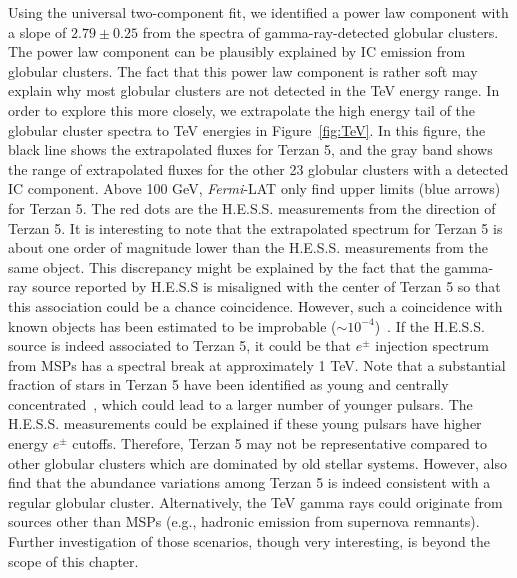 \documentclass[doublespace,nopageskip]{VTthesis}
\begin{document}
Using the universal two-component fit, we identified a power law component with a slope of $2.79 \pm  0.25$ from the spectra of gamma-ray-detected globular clusters. The power law component can be plausibly explained by IC emission from globular clusters. The fact that this power law component is rather soft may explain why most globular clusters are not detected in the TeV energy range. In order to explore this more closely, we extrapolate the high energy tail of the globular cluster spectra to TeV energies in Figure~\ref{fig:TeV}. In this figure, the black line shows the extrapolated fluxes for Terzan 5, and the gray band shows the range of extrapolated fluxes for the other 23 globular clusters with a detected IC component. Above 100 GeV, {\it Fermi}-LAT only find upper limits (blue arrows) for Terzan 5. The red dots are the H.E.S.S. measurements from the direction of Terzan 5. It is interesting to note that the extrapolated spectrum for Terzan 5 is about one order of magnitude lower than the H.E.S.S. measurements from the same object. This discrepancy might be explained by the fact that the gamma-ray source reported by H.E.S.S is misaligned with the center of Terzan 5 so that this association could be a chance coincidence. However, such a coincidence with known objects has been estimated to be improbable ($\sim 10^{-4}$)~\citep{2011A&A...531L..18H}. If the H.E.S.S. source is indeed associated to Terzan 5, it could be that $e^\pm$ injection spectrum from MSPs has a spectral break at approximately 1 TeV. Note that a substantial fraction of stars in Terzan 5 have been identified as young and centrally concentrated~\citep{2016ApJ...828...75F,2020BAAA..61R...90G}, which could lead to a larger number of younger pulsars. The H.E.S.S. measurements could be explained if these young pulsars have higher energy $e^\pm$ cutoffs. Therefore, Terzan 5 may not be representative compared to other globular clusters which are dominated by old stellar systems. However, \citet{2019AJ....158...14N} also find that the abundance variations among Terzan 5 is indeed consistent with a regular globular cluster. Alternatively, the TeV gamma rays could originate from sources other than MSPs (e.g., hadronic emission from supernova remnants). Further investigation of those scenarios, though very interesting, is beyond the scope of this chapter. 
\end{document}
